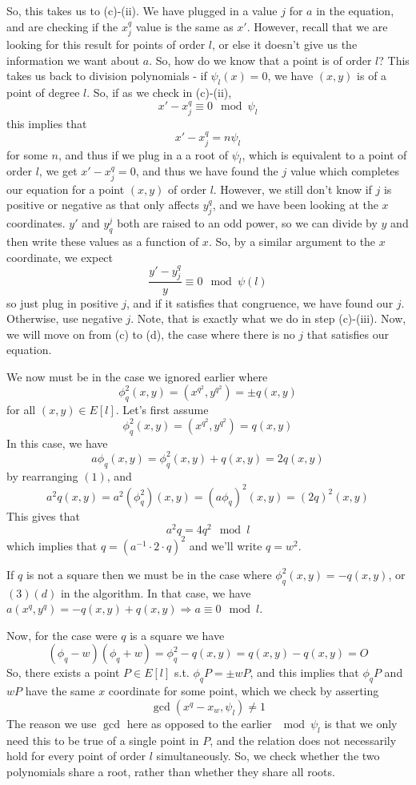 \documentclass[11pt,reqno]{amsart}
\theoremstyle{definition}
\begin{document}
So, this takes us to (c)-(ii). We have plugged in a value $j$ for $a$ in the equation, and are checking if the $x_j^q$ value is the same as $x'$. However, recall that we are looking for this result for points of order $l$, or else it doesn't give us the information we want about $a$. So, how do we know that a point is of order $l$? This takes us back to division polynomials - if $\psi_l(x) = 0$, we have $(x, y)$ is of a point of degree $l$. So, if as we check in (c)-(ii), $$x'-x_j^q \equiv 0 \mod \psi_l$$ this implies that $$x'-x_j^q = n\psi_l$$ for some $n$, and thus if we plug in a a root of $\psi_l$, which is equivalent to a point of order $l$, we get $x'-x_j^q = 0$, and thus we have found the $j$ value which completes our equation for a point $(x, y)$ of order $l$. However, we still don't know if $j$ is positive or negative as that only affects $y^q_j$, and we have been looking at the $x$ coordinates. $y'$ and $y_q^j$ both are raised to an odd power, so we can divide by $y$ and then write these values as a function of $x$. So, by a similar argument to the $x$ coordinate, we expect $$\frac{y'-y_j^q}{y} \equiv 0 \mod \psi(l)$$ so just plug in positive $j$, and if it satisfies that congruence, we have found our $j$. Otherwise, use negative $j$. Note, that is exactly what we do in step (c)-(iii). Now, we will move on from (c) to (d), the case where there is no $j$ that satisfies our equation.

We now must be in the case we ignored earlier where $$\phi_q^2(x, y) =(x^{q^2}, y^{q^2}) = \pm q(x, y)$$ for all $(x, y) \in E[l]$. Let's first assume $$\phi_q^2(x, y) =(x^{q^2}, y^{q^2}) = q(x, y)$$ In this case, we have $$a\phi_q(x, y) = \phi_q^2(x, y) + q(x, y) = 2q(x, y)$$ by rearranging $(1)$, and $$a^2q(x,y) = a^2(\phi_q^2)(x,y) = (a\phi_q)^2(x, y) = (2q)^2(x, y)$$ This gives that $$a^2q = 4q^2 \mod l$$ which implies that $q = (a^{-1}\cdot2\cdot q)^2$ and we'll write $q = w^2$. 

If $q$ is not a square then we must be in the case where $\phi_q^2(x, y) = -q(x, y)$, or $(3)(d)$ in the algorithm. In that case, we have $a(x^q, y^q) = -q(x, y) + q(x, y) \Rightarrow a \equiv 0 \mod l$.

Now, for the case were $q$ is a square we have $$(\phi_q-w)(\phi_q+w) = \phi_q^2-q(x, y) = q(x, y) - q(x, y)  = O$$ So, there exists a point $P \in E[l]$ s.t. $\phi_qP = \pm wP$, and this implies that $\phi_qP$ and $wP$ have the same $x$ coordinate for some point, which we check by asserting $$\gcd(x^q-x_w, \psi_l) \neq 1$$ The reason we use $\gcd$ here as opposed to the earlier $\mod \psi_l$ is that we only need this to be true of a single point in $P$, and the relation does not necessarily hold for every point of order $l$ simultaneously. So, we check whether the two polynomials share a root, rather than whether they share all roots. 
\end{document}

